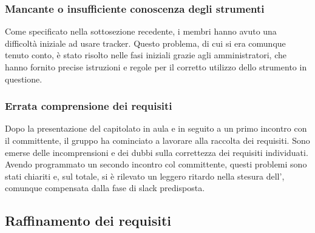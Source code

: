 \documentclass[a4paper, titlepage]{article}
\begin{document}
	\subsubsection{Mancante o insufficiente conoscenza degli strumenti}
	Come specificato nella sottosezione recedente, i membri hanno avuto una difficoltà iniziale ad usare tracker. Questo problema, di cui si era comunque tenuto conto, è stato risolto nelle fasi iniziali grazie agli amministratori, che hanno fornito precise istruzioni e regole per il corretto utilizzo dello strumento in questione.
	
	\subsubsection{Errata comprensione dei requisiti}
	Dopo la presentazione del capitolato in aula e in seguito a un primo incontro con il committente, il gruppo ha cominciato a lavorare alla raccolta dei requisiti. Sono emerse delle incomprensioni e dei dubbi sulla correttezza dei requisiti individuati. Avendo programmato un secondo incontro col committente, questi problemi sono stati chiariti e, sul totale, si è rilevato un leggero ritardo nella stesura dell', comunque compensata dalla fase di slack predisposta.
	
	\subsection{Raffinamento dei requisiti}
	
\end{document}
